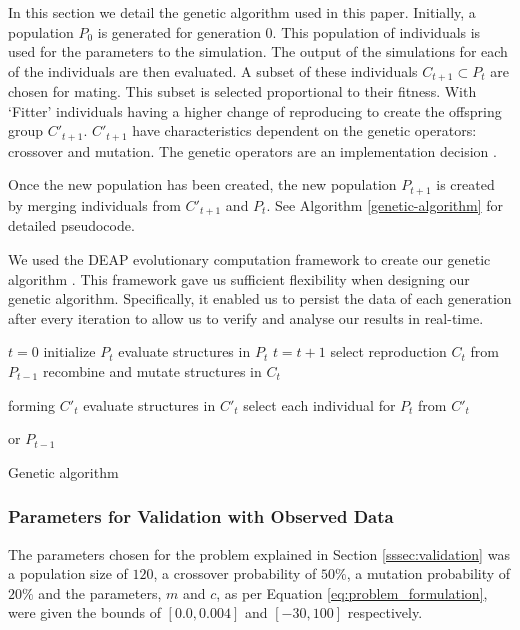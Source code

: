 In this section we detail the genetic algorithm used in this paper. Initially, a population $P_{0}$ is generated for generation 0. This population of individuals is used for the parameters to the simulation. The output of the simulations for each of the individuals are then evaluated. A subset of these individuals $C_{t+1} \subset P_{t}$ are chosen for mating. This subset is selected proportional to their fitness. With `Fitter' individuals having a higher change of reproducing to create the offspring group $C'_{t+1}$. $C'_{t+1}$ have characteristics dependent on the genetic operators: crossover and mutation. The genetic operators are an implementation decision \cite{FogelDavidB2009}. 

Once the new population has been created, the new population $P_{t+1}$ is created by merging individuals from $C'_{t+1}$ and $P_{t}$. See Algorithm \ref{genetic-algorithm} for detailed pseudocode.

We used the DEAP evolutionary computation framework to create our genetic algorithm \cite{Gagn2012}. This framework gave us sufficient flexibility when designing our genetic algorithm. Specifically, it enabled us to persist the data of each generation after every iteration to allow us to verify and analyse our results in real-time.

%
\begin{algorithm}[t]
	\begin{algorithmic}[1]
		\State $t=0$
		\State initialize $P_{t}$
		\State evaluate structures in $P_{t}$
		\State $t=t+1$
		\State select reproduction $C_{t}$ from $P_{t-1}$
		\State recombine and mutate structures in $C_{t}$
		
		forming $C'_{t}$
		\State evaluate structures in $C'_{t}$
		\State select each individual for $P_{t}$ from $C'_{t}$ 
		
		or $P_{t-1}$
		\EndWhile
		\caption{Genetic algorithm \cite{FogelDavidB2009}}
		\label{genetic-algorithm}
	\end{algorithmic}
\end{algorithm}

\subsubsection{Parameters for Validation with Observed Data}
\label{ssec:ga_params_valid}

The parameters chosen for the problem explained in Section \ref{sssec:validation} was a population size of $120$, a crossover probability of $50\%$, a mutation probability of $20\%$ and the parameters, $m$ and $c$, as per Equation \ref{eq:problem_formulation}, were given the bounds of $[0.0, 0.004]$ and $[-30, 100]$ respectively. 

